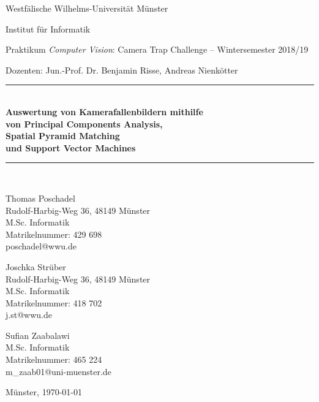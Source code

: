 \begin{titlepage}
	\newcommand{\HRule}{\rule{\linewidth}{0.8mm}}
	
	Westfälische Wilhelms-Universität Münster
	
	Institut für Informatik
	
	Praktikum \textit{Computer Vision}: Camera Trap Challenge -- Wintersemester 2018/19 
	
	Dozenten: Jun.-Prof. Dr. Benjamin Risse, Andreas Nienkötter

	\center
 
 	
	
	\HRule \\[0.5cm]
	{ \huge \sffamily\bfseries Auswertung von Kamerafallenbildern mithilfe \\ von Principal Components Analysis, \\ Spatial Pyramid Matching \\ und Support Vector Machines\\[0.4cm]}
	\HRule \\[0.5cm]
	
	
	\vfill
	\flushright
	
	Thomas Poschadel \\
	Rudolf-Harbig-Weg 36, 48149 Münster \\
	M.Sc. Informatik \\
	Matrikelnummer: 429 698 \\
	poschadel@wwu.de \\
	
	\vspace{2em}
	
	Joschka Strüber \\
	Rudolf-Harbig-Weg 36, 48149 Münster \\
	M.Sc. Informatik \\
	Matrikelnummer: 418 702 \\
	j.st@wwu.de \\
	
	\vspace{2em}
	
	Sufian Zaabalawi \\
	M.Sc. Informatik \\
	Matrikelnummer: 465 224\\
	m\_zaab01@uni-muenster.de \\
	
	\vspace{2em}
	
	Münster, \today
	
	\restoregeometry
\end{titlepage}
